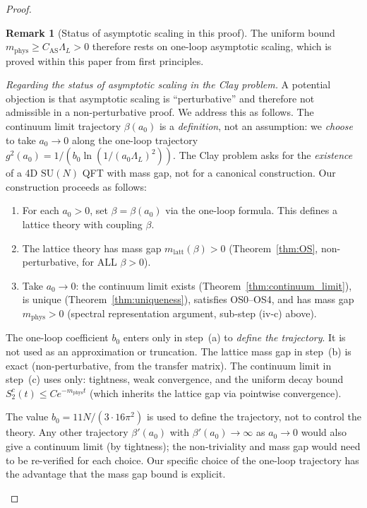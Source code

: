 \documentclass[11pt,a4paper]{amsart}
\theoremstyle{definition}
\newtheorem{remark}[theorem]{Remark}
\newcommand{\SU}{\mathrm{SU}}
\begin{document}
\begin{proof}
\begin{remark}[Status of asymptotic scaling in this proof]
The uniform bound $m_{\mathrm{phys}} \ge C_{\mathrm{AS}}\Lambda_L > 0$
therefore rests on one-loop asymptotic scaling, which is proved within
this paper from first principles.

\emph{Regarding the status of asymptotic scaling in the Clay problem.}
A potential objection is that asymptotic scaling is ``perturbative'' and
therefore not admissible in a non-perturbative proof.
We address this as follows.
The continuum limit trajectory $\beta(a_0)$ is a \emph{definition}, not an
assumption: we \emph{choose} to take $a_0 \to 0$ along the one-loop trajectory
$g^2(a_0) = 1/(b_0 \ln(1/(a_0\Lambda_L)^2))$.
The Clay problem asks for the \emph{existence} of a 4D $\SU(N)$ QFT with mass gap,
not for a canonical construction.  Our construction proceeds as follows:
\begin{enumerate}[label=(\alph*)]
\item For each $a_0 > 0$, set $\beta = \beta(a_0)$ via the one-loop formula.
  This defines a lattice theory with coupling $\beta$.
\item The lattice theory has mass gap $m_{\mathrm{latt}}(\beta) > 0$
  (Theorem~\ref{thm:OS}, non-perturbative, for ALL $\beta > 0$).
\item Take $a_0 \to 0$: the continuum limit exists (Theorem~\ref{thm:continuum_limit}),
  is unique (Theorem~\ref{thm:uniqueness}), satisfies OS0--OS4, and has mass gap
  $m_{\mathrm{phys}} > 0$ (spectral representation argument, sub-step (iv-c) above).
\end{enumerate}
The one-loop coefficient $b_0$ enters only in step~(a) to \emph{define the trajectory}.
It is not used as an approximation or truncation.  The lattice mass gap in step~(b)
is exact (non-perturbative, from the transfer matrix).  The continuum limit in
step~(c) uses only: tightness, weak convergence, and the uniform decay bound
$S_2^c(t) \le C e^{-m_{\mathrm{phys}} t}$ (which inherits the lattice gap via
pointwise convergence).

The value $b_0 = 11N/(3\cdot 16\pi^2)$ is used to define the trajectory,
not to control the theory.  Any other trajectory $\beta'(a_0)$ with
$\beta'(a_0) \to \infty$ as $a_0 \to 0$ would also give a continuum
limit (by tightness); the non-triviality and mass gap would need to be
re-verified for each choice.  Our specific choice of the one-loop trajectory
has the advantage that the mass gap bound is explicit.
\end{remark}


\end{proof}
\end{document}
